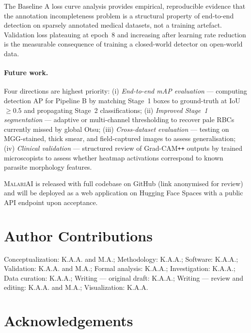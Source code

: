 \documentclass[10pt,twocolumn]{article}
\newcommand{\malariai}{\textsc{MalariAI}}
\begin{document}
The Baseline A loss curve analysis provides empirical, reproducible
evidence that the annotation incompleteness problem is a structural
property of end-to-end detection on sparsely annotated medical datasets,
not a training artefact. Validation loss plateauing at epoch~8 and
increasing after learning rate reduction is the measurable consequence
of training a closed-world detector on open-world data.

\paragraph{Future work.}
Four directions are highest priority:
(i) \textit{End-to-end mAP evaluation} --- computing detection AP for
Pipeline B by matching Stage~1 boxes to ground-truth at IoU~$\geq 0.5$
and propagating Stage~2 classifications;
(ii) \textit{Improved Stage~1 segmentation} --- adaptive or multi-channel
thresholding to recover pale RBCs currently missed by global Otsu;
(iii) \textit{Cross-dataset evaluation} --- testing on MGG-stained, thick
smear, and field-captured images to assess generalisation;
(iv) \textit{Clinical validation} --- structured review of Grad-CAM\texttt{++}
outputs by trained microscopists to assess whether heatmap activations
correspond to known parasite morphology features.

\malariai{} is released with full codebase on GitHub (link anonymised for
review) and will be deployed as a web application on Hugging Face Spaces
with a public API endpoint upon acceptance.

\section*{Author Contributions}

Conceptualization: K.A.A. and M.A.; Methodology: K.A.A.; Software: K.A.A.;
Validation: K.A.A. and M.A.; Formal analysis: K.A.A.; Investigation: K.A.A.;
Data curation: K.A.A.; Writing --- original draft: K.A.A.;
Writing --- review and editing: K.A.A. and M.A.;
Visualization: K.A.A.

\section*{Acknowledgements}
\end{document}
